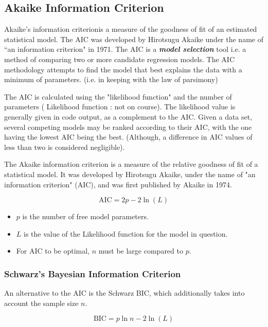 \documentclass[a4paper,12pt]{article}
\begin{document}
\subsection{Akaike Information Criterion}


Akaike's information criterionis a measure of the goodness of fit of
an estimated statistical model. The AIC was developed by Hirotsugu Akaike under the name of ``an information criterion" in 1971. The AIC is a \textbf{\textit{model selection}} tool i.e. a method of comparing two
or more candidate regression models. The AIC methodology attempts to find the model that best explains the data with a minimum of parameters. (i.e. in keeping with the law of parsimony)

The AIC is calculated using the "likelihood function" and the number of parameters ( Likelihood function : not on course). The likelihood value is generally given in code output, as a complement to the AIC.
Given a data set, several competing models may be ranked according to their AIC, with the one having the lowest AIC being the best. (Although, a difference in AIC values of less than two is considered negligible).

The Akaike information criterion is a measure of the relative goodness of fit of a statistical model. It was developed by Hirotsugu Akaike, under the name of "an information criterion" (AIC), and was first published by Akaike in 1974.
\bigskip

\[\mbox{AIC} = 2p - 2\ln(L)\]

\begin{itemize}
	\item $p$ is the number of free model parameters.
	\item $L$ is the value of the Likelihood function for the model in question.
	\item For AIC to be optimal, $n$ must be large compared to $p$.\\
\end{itemize}
\subsubsection{Schwarz's Bayesian Information Criterion}
An alternative to the AIC is the Schwarz BIC, which additionally takes into account the sample size $n$.

\[\mbox{BIC} = p\ln{n} - 2\ln(L)\]
\end{document}
